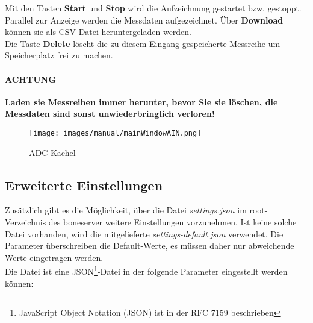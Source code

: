 \documentclass[manual.tex]{subfiles}
\begin{document}
Mit den Tasten \textbf{Start} und \textbf{Stop} wird die Aufzeichnung gestartet bzw. gestoppt. Parallel zur Anzeige werden die Messdaten aufgezeichnet. Über \textbf{Download} können sie als CSV-Datei heruntergeladen werden.\\

Die Taste \textbf{Delete} löscht die zu diesem Eingang gespeicherte Messreihe um Speicherplatz frei zu machen.

\paragraph{\color{red} ACHTUNG} \textbf{\color{red} Laden sie Messreihen immer herunter, bevor Sie sie löschen, die Messdaten sind sonst unwiederbringlich verloren!}

\begin{figure}[ht] 
	\centering
	\texttt{[image: images/manual/mainWindowAIN.png]}
	\caption{ADC-Kachel}
	\label{fig:mainWindowADC}
\end{figure}


\subsection{Erweiterte Einstellungen}
Zusätzlich gibt es die Möglichkeit, über die Datei \textit{settings.json} im root-Verzeichnis des boneserver weitere Einstellungen vorzunehmen. Ist keine solche Datei vorhanden, wird die mitgelieferte \textit{settings-default.json} verwendet. Die Parameter überschreiben die Default-Werte, es müssen daher nur abweichende Werte eingetragen werden.\\

Die Datei ist eine JSON\footnote{JavaScript Object Notation (JSON) ist in der RFC 7159 beschrieben}-Datei in der folgende Parameter eingestellt werden können:\\
\end{document}
